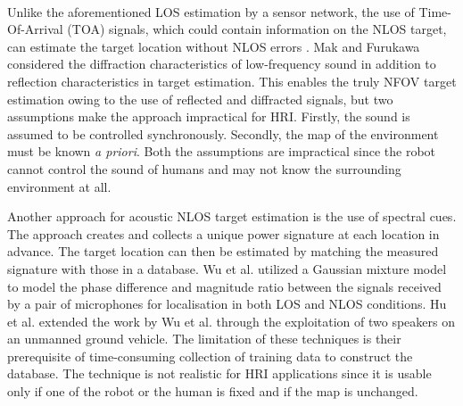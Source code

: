 \documentclass[letterpaper, 10 pt, conference]{ieeeconf}  %
\begin{document}
\\
Unlike the aforementioned LOS estimation by a sensor network, the use of Time-Of-Arrival (TOA) signals, which could contain information on the NLOS target, can estimate the target location without NLOS errors \cite{girod2001robust,smith1987closed}.  Mak and Furukawa \cite{Mak2009} considered the diffraction characteristics of low-frequency sound in addition to reflection characteristics in target estimation.  This enables the truly NFOV target estimation owing to the use of reflected and diffracted signals, but two assumptions make the approach impractical for HRI.  Firstly, the sound is assumed to be controlled synchronously.  Secondly, the map of the environment must be known \textit{a priori}.  Both the assumptions are impractical since the robot cannot control the sound of humans and may not know the surrounding environment at all.  

Another approach for acoustic NLOS target estimation is the use of spectral cues.  The approach creates and collects a unique power signature at each location in advance. The target location can then be estimated by matching the measured signature with those in a database.  Wu  et  al. \cite{wu2007gaussian} utilized a Gaussian mixture model to model the phase difference and magnitude ratio between the signals received by a pair of microphones for localisation in both LOS and NLOS conditions. Hu et al. \cite{hu2006location} extended the work by Wu et al. through the exploitation of two speakers on an unmanned ground  vehicle.  The limitation  of these techniques is  their  prerequisite  of  time-consuming  collection of training data to construct the database.  The technique is not realistic for HRI applications since it is usable only if one of the robot or the human is fixed and if the map is unchanged.  
\end{document}
